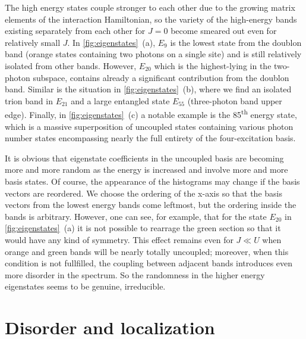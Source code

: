 \documentclass[%
 aps, pra,
 amsmath,amssymb,
 reprint,%
superscriptaddress
]{revtex4-2}
\begin{document}
The high energy states couple stronger to each other due to the growing matrix elements of the interaction Hamiltonian, so the variety of the high-energy bands existing separately from each other for $J=0$ become smeared out even for relatively small $J$.  In \autoref{fig:eigenstates}~(a), $E_9$ is the lowest state from the doublon band (orange states containing two photons on a single site) and is still relatively isolated from other bands. However, $E_{20}$ which is the highest-lying in the two-photon subspace, contains already a significant contribution from the doublon band. Similar is the situation in \autoref{fig:eigenstates}~(b), where we find an isolated trion band in $E_{21}$ and a large entangled state $E_{55}$ (three-photon band upper edge). Finally, in \autoref{fig:eigenstates}~(c) a notable example is the 85\textsuperscript{th} energy state, which is a massive superposition of uncoupled states containing various photon number states encompassing nearly the full entirety of the four-excitation basis. 

It is obvious that eigenstate coefficients in the uncoupled basis are becoming more and more random as the energy is increased and involve more and more basis states. Of course, the appearance of the histograms may change if the basis vectors are reordered. We choose the ordering of the x-axis so that the basis vectors from the lowest energy bands come leftmost, but the ordering inside the bands is arbitrary. However, one can see, for example, that for the state $E_{20}$ in \autoref{fig:eigenstates}~(a) it is not possible to rearrage the green section so that it would have any kind of symmetry. This effect remains even for $J\ll U$ when orange and green bands will be nearly totally uncoupled; moreover, when this condition is not fullfilled, the coupling between adjacent bands introduces even more disorder in the spectrum. So the randomness in the higher energy eigenstates seems to be genuine, irreducible.


\section{Disorder and localization}
\end{document}
